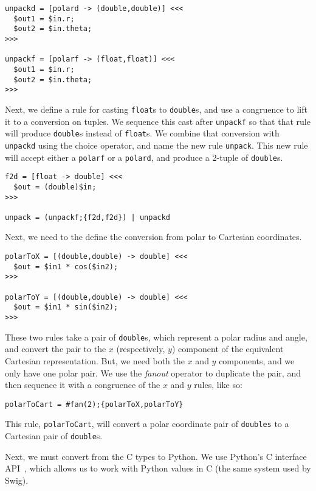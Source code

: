 \begin{verbatim}
unpackd = [polard -> (double,double)] <<<
  $out1 = $in.r;
  $out2 = $in.theta;
>>>

unpackf = [polarf -> (float,float)] <<<
  $out1 = $in.r;
  $out2 = $in.theta;
>>>
\end{verbatim}

Next, we define a rule for casting \texttt{float}s to \texttt{double}s, and use a congruence to lift it to a conversion on tuples. We sequence this cast after \texttt{unpackf} so that that rule will produce \texttt{double}s instead of \texttt{float}s. We combine that conversion with \texttt{unpackd} using the choice operator, and name the new rule \texttt{unpack}. This new rule will accept either a \texttt{polarf} or a \texttt{polard}, and produce a 2-tuple of \texttt{double}s.

\begin{verbatim}
f2d = [float -> double] <<<
  $out = (double)$in;
>>>

unpack = (unpackf;{f2d,f2d}) | unpackd
\end{verbatim}

Next, we need to the define the conversion from polar to Cartesian coordinates.

\begin{verbatim}
polarToX = [(double,double) -> double] <<<
  $out = $in1 * cos($in2);  
>>>

polarToY = [(double,double) -> double] <<<
  $out = $in1 * sin($in2);
>>>
\end{verbatim}

These two rules take a pair of \texttt{double}s, which represent a polar radius and angle, and convert the pair to the $x$ (respectively, $y$) component of the equivalent Cartesian representation. But, we need both the $x$ and $y$ components, and we only have one polar pair. We use the \emph{fanout} operator to duplicate the pair, and then sequence it with a congruence of the $x$ and $y$ rules, like so:

\begin{verbatim}
polarToCart = #fan(2);{polarToX,polarToY}
\end{verbatim}

This rule, \texttt{polarToCart}, will convert a polar coordinate pair of \texttt{doubles} to a Cartesian pair of \texttt{double}s.

Next, we must convert from the C types to Python. We use Python's C interface API~\cite{python-c-api}, which allows us to work with Python values in C (the same system used by Swig).

